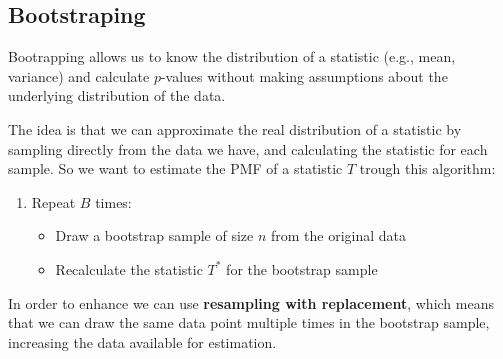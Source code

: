 \subsection{Bootstraping}
Bootrapping allows us to know the distribution of a statistic (e.g., mean, variance) and calculate $p$-values without making assumptions about the underlying distribution of the data.

The idea is that we can approximate the real distribution of a statistic by sampling directly from the data we have, and calculating the statistic for each sample.
So we want to estimate the PMF of a statistic $T$ trough this algorithm:
\begin{enumerate}
    \item Repeat $B$ times:
    \begin{itemize}
        \item Draw a bootstrap sample of size $n$ from the original data
        \item Recalculate the statistic $T^*$ for the bootstrap sample
    \end{itemize}
\end{enumerate}
In order to enhance we can use \textbf{resampling with replacement}, which means that we can draw the same data point multiple times in the bootstrap sample, increasing the data available for estimation.
